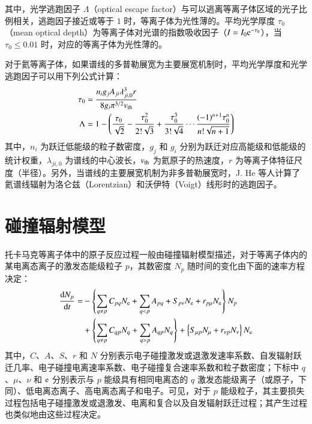 其中，光学逃跑因子 $\Lambda$（optical escape factor）与可以逃离等离子体区域的光子比例相关，逃跑因子接近或等于 $1$ 时，等离子体为光性薄的。平均光学厚度 $\tau_0$（mean optical depth）为等离子体对光谱的指数吸收因子（$I=I_0{\rm e}^{-\tau_0}$），当 $\tau_0\le0.01$ 时，对应的等离子体为光性薄的。

对于氦等离子体，如果谱线的多普勒展宽为主要展宽机制时\cite{Wiese1966:book}，平均光学厚度和光学逃跑因子可以用下列公式计算\cite{Drawin1973:OEF,boivin2001}：
\begin{align}
  \tau_0&=\frac{n_ig_jA_{ji}\lambda_{ji,0}^3r}{8g_i\pi^{3/2}v_{\rm th}} \label{eq:chap02:mod}\\
  \Lambda&=1-\left(\frac{\tau_0}{\sqrt{2}}-\frac{\tau_0^2}{2!\sqrt{3}}+\frac{\tau_0^3}{3!\sqrt{4}}\cdots\frac{(-1)^{n+1}\tau_0^n}{n!\sqrt{n+1}}\right)
\end{align}
其中，$n_i$ 为跃迁低能级的粒子数密度，$g_j$ 和 $g_i$ 分别为跃迁对应高能级和低能级的统计权重，$\lambda_{ji,0}$ 为谱线的中心波长，$v_{\rm th}$ 为氦原子的热速度，$r$ 为等离子体特征尺度（半径）。另外，当谱线的主要展宽机制为非多普勒展宽时，J. He 等人\cite{HeJian2006:ef}计算了氦谱线辐射为洛仑兹（Lorentzian）和沃伊特（Voigt）线形时的逃跑因子。

\section{碰撞辐射模型}

托卡马克等离子体中的原子反应过程一般由碰撞辐射模型描述，对于等离子体内的某电离态离子的激发态能级粒子 $p$，其数密度 $N_p$ 随时间的变化由下面的速率方程决定：
\begin{equation}
\begin{aligned}
  \frac{{\rm d}N_p}{{\rm d}t}=
  &-\left\{\sum_{q\ne p}C_{pq}N_{\rm e}+\sum_{q<p}A_{pq}+S_{p\nu}N_{\rm e}+r_{p\mu}N_{\rm e}\right\}N_p\\
  &+\left\{\sum_{q\ne p}C_{qp}N_q+\sum_{q>p}A_{qp}N_q\right\}+\left\{S_{\mu p}N_{\mu}+r_{\nu p}N_\nu\right\}N_{\rm e}
\end{aligned}
\end{equation}
其中，$C$、$A$、$S$、$r$ 和 $N$ 分别表示电子碰撞激发或退激发速率系数、自发辐射跃迁几率、电子碰撞电离速率系数、电子碰撞复合速率系数和粒子数密度；下标中 $q$、$\mu$、$\nu$ 和 ${\rm e}$ 分别表示与 $p$ 能级具有相同电离态的 $q$ 激发态能级离子（或原子，下同）、低电离态离子、高电离态离子和电子。可见，对于 $p$ 能级粒子，其主要损失过程包括电子碰撞激发或退激发、电离和复合以及自发辐射跃迁过程；其产生过程也类似地由这些过程决定。

